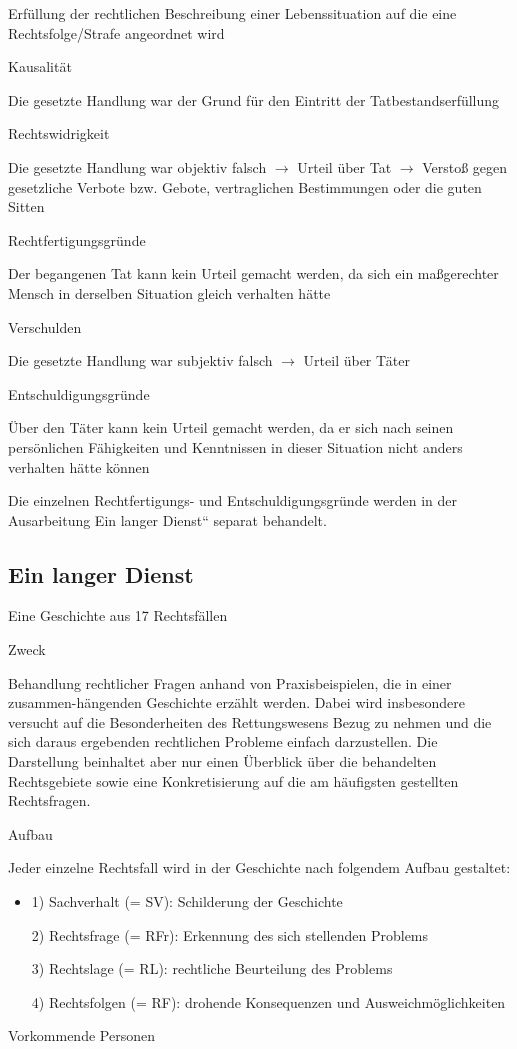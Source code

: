 \documentclass{article}
\begin{document}
Erf\"ullung der rechtlichen Beschreibung einer Lebenssituation auf die
eine Rechtsfolge/Strafe angeordnet wird

Kausalit\"at

Die gesetzte Handlung war der Grund f\"ur den Eintritt der
Tatbestandserf\"ullung

Rechtswidrigkeit

Die gesetzte Handlung war objektiv falsch ${\rightarrow}$ Urteil \"uber
Tat ${\rightarrow}$ Versto{\ss} gegen gesetzliche Verbote bzw. Gebote,
vertraglichen Bestimmungen oder die guten Sitten 

 Rechtfertigungsgr\"unde

 Der begangenen Tat kann kein Urteil gemacht werden, da sich ein
ma{\ss}gerechter Mensch in  derselben Situation gleich verhalten
h\"atte

Verschulden

Die gesetzte Handlung war subjektiv falsch ${\rightarrow}$ Urteil \"uber
T\"ater

 Entschuldigungsgr\"unde

 \"Uber den T\"ater kann kein Urteil gemacht werden, da er sich nach
seinen pers\"onlichen   F\"ahigkeiten und Kenntnissen in dieser
Situation nicht anders verhalten h\"atte k\"onnen

Die einzelnen Rechtfertigungs- und Entschuldigungsgr\"unde werden in der
Ausarbeitung {\quotedblbase}Ein langer Dienst{\textquotedblleft}
separat behandelt.

\subsection{Ein langer Dienst}
Eine Geschichte aus 17 Rechtsf\"allen

Zweck

Behandlung rechtlicher Fragen anhand von Praxisbeispielen, die in einer
zusammen-h\"angenden Geschichte erz\"ahlt werden. Dabei wird
insbesondere versucht auf die Besonderheiten des Rettungswesens Bezug
zu nehmen und die sich daraus ergebenden rechtlichen Probleme einfach
darzustellen. Die Darstellung beinhaltet aber nur einen \"Uberblick
\"uber die behandelten Rechtsgebiete sowie eine Konkretisierung auf die
am h\"aufigsten gestellten Rechtsfragen. 

Aufbau

Jeder einzelne Rechtsfall wird in der Geschichte nach folgendem Aufbau
gestaltet:

\begin{itemize}
\item[] 1) Sachverhalt (= SV): Schilderung der Geschichte

2) Rechtsfrage (= RFr): Erkennung des sich stellenden Problems

3) Rechtslage (= RL): rechtliche Beurteilung des Problems

4) Rechtsfolgen (= RF): drohende Konsequenzen und
Ausweichm\"oglichkeiten

\end{itemize}
Vorkommende Personen
\end{document}
